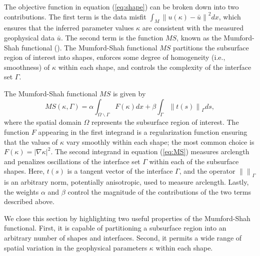 \documentclass[manuscript,revised]{geophysics}
\newcommand\norm[1]{\left\lVert#1\right\rVert}
\begin{document}
The objective function in equation (\ref{eq:shape}) can be broken down into two contributions.  The first term is the data misfit  $\int_M \norm{u(\kappa)-\bar{u}}^2  dx$, which ensures that the inferred parameter values $\kappa$ are consistent with the measured geophysical data $\bar{u}$.  The second term is the function $MS$, known as the Mumford-Shah functional (\cite{Mumford_1989}). The Mumford-Shah functional $MS$ partitions the subsurface region of interest into shapes, enforces some degree of homogeneity (i.e., smoothness) of $\kappa$ within each shape, and controls the complexity of the interface set $\Gamma$. 

The Mumford-Shah functional $MS$ is given by
\begin{equation} \label{eq:MS}
MS(\kappa,\Gamma)=\alpha \int_{\Omega\backslash\Gamma} F(\kappa) dx + \beta\int_\Gamma \norm{t(s)}_\Gamma  ds ,
\end{equation}
where the spatial domain $\Omega$ represents the subsurface region of interest.  The function $F$ appearing in the first integrand is a regularization function ensuring that the values of $\kappa$ vary smoothly within each shape; the most common choice is $F(\kappa)=\left\vert \nabla \kappa \right\vert^2$.   The second integrand in equation (\ref{eq:MS}) measures arclength and penalizes oscillations of the interface set $\Gamma$ within each of the subsurface shapes.  Here, $t(s)$ is a tangent vector of the interface $\Gamma$, and the operator $\norm{}_\Gamma$ is an arbitrary norm, potentially anisotropic, used to measure arclength.  Lastly, the weights $\alpha$ and $\beta$ control the magnitude of the contributions of the two terms described above.  


We close this section by highlighting two useful properties of the Mumford-Shah functional.  First, it is capable of partitioning a subsurface region into an arbitrary number of shapes and interfaces. Second, it permits a wide range of spatial variation in the geophysical parameters $\kappa$ within each shape.
\end{document}
